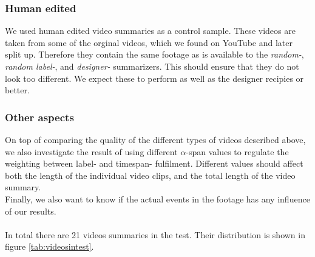 \subsubsection{Human edited}
%
We used human edited video summaries as a control sample. These videos are taken from some of the orginal videos, which we found on YouTube and later split up. Therefore they contain the same footage as is available to the \textit{random-}, \textit{random label-}, and \textit{designer-} summarizers. This should ensure that they do not look too different. We expect these to perform as well as the designer recipies or better.
%
\subsubsection{Other aspects}\label{sec:otheraspects}
%
On top of comparing the quality of the different types of videos described above, we also investigate the result of using different $\alpha$-span values to regulate the weighting between label- and timespan- fulfilment. Different values should affect both the length of the individual video clips, and the total length of the video summary.\\
Finally, we also want to know if the actual events in the footage has any influence of our results.\\\\
%
In total there are 21 videos summaries in the test. Their distribution is shown in figure \ref{tab:videosintest}.
%
